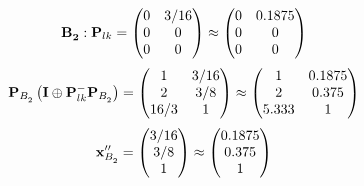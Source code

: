 \documentclass[10pt,a4paper]{article}
\begin{document}
	\[
		\bold{B_2^{}}: \bold{P}_{lk} = 
		\begin{pmatrix}
			{{0}}{} & {{3}} / {{16}} \\
			{{0}}{} & {{0}}{} \\
			{{0}}{} & {{0}}{} \\
		\end{pmatrix}
		\approx
		\begin{pmatrix}
			0        & 0.1875   \\
			0        & 0        \\
			0        & 0        \\
		\end{pmatrix}
	\]
	\[
		\bold{P}_{B_2^{}}\left(\bold{I} \oplus \bold{P}_{lk}^{-}\bold{P}_{B_2^{}}\right) = 
		\begin{pmatrix}
			{1}{} & {{3}} / {{16}} \\
			{{2}}{} & {{3}} / {{8}} \\
			{{16}} / {{3}} & {1}{} \\
		\end{pmatrix}
		\approx
		\begin{pmatrix}
			1        & 0.1875   \\
			2        & 0.375    \\
			5.333    & 1        \\
		\end{pmatrix}
	\]
	\[
		\bold{x}''_{B_2^{}} = 
		\begin{pmatrix}
			{{3}} / {{16}} \\
			{{3}} / {{8}} \\
			{1}{} \\
		\end{pmatrix}
		\approx
		\begin{pmatrix}
			0.1875   \\
			0.375    \\
			1        \\
		\end{pmatrix}
	\]

\end{document}

